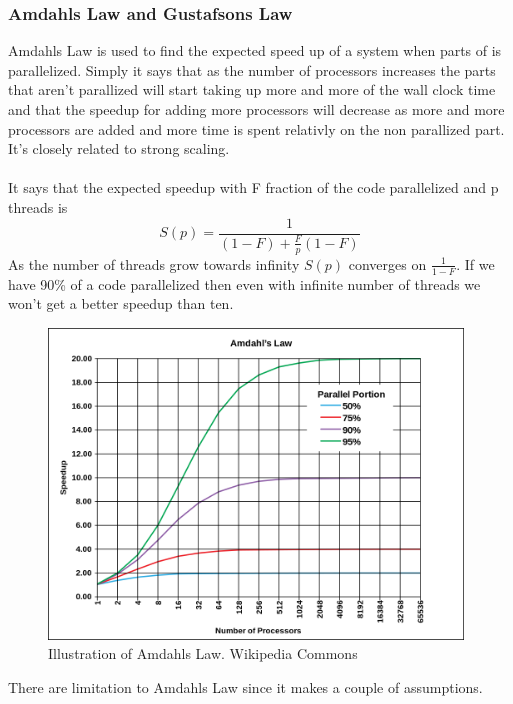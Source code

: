 \documentclass[10pt,a4paper]{article}
\begin{document}
\subsubsection{Amdahls Law and Gustafsons Law}
Amdahls Law is used to find the expected speed up of a system when parts of is parallelized. Simply it says that as the number of processors increases the parts that aren't parallized will start taking up more and more of the wall clock time and that the speedup for adding more processors will decrease as more and more processors are added and more time is spent relativly on the non parallized part. It's closely related to strong scaling.\cite{cuda_best_practice,2010_reevaluating_amdahl}\\
\\
It says that the expected speedup with F fraction of the code parallelized and p threads is 
$$S(p)=\frac{1}{(1-F)+\frac{F}{p}(1-F)}$$
As the number of threads grow towards infinity $S(p)$ converges on $\frac{1}{1-F}$. If we have 90\% of a code parallelized then even with infinite number of threads we won't get a better speedup than ten.\cite{2010_reevaluating_amdahl}

\begin{figure}[h]
    \centering
    \includegraphics[width=11cm]{AmdahlsLaw.png}
    \caption{Illustration of Amdahls Law. Wikipedia Commons}
    \label{fig:AmdahlsLaw}
\end{figure}

There are limitation to Amdahls Law since it makes a couple of assumptions.
\end{document}
